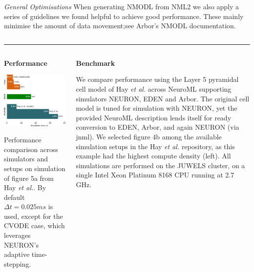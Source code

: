 \documentclass{beamer}
\begin{document}
\begin{frame}[t, fragile]
\begin{columns}[t]
\begin{column}{0.49\textwidth}
      \emph{General Optimisations} When generating NMODL from NML2 we also apply
      a series of guidelines we found helpful to achieve good performance. These
      mainly minimise the amount of data movement;\@ see Arbor's NMODL
      documentation.
    \end{column}
  \end{columns}
  \vspace*{1ex}
  \textcolor{arborange}{\rule{\textwidth}{0.5ex}}
  \vspace*{-1ex}
  \begin{columns}
    \begin{column}{0.74\textwidth}
  \begin{columns}[t]
    \begin{column}[t]{0.45\textwidth}
      \textbf{Performance}
      \vspace*{1ex}

      \includegraphics[width=\textwidth]{./benchmark/barchart_cropped.pdf}

      Performance comparison across simulators and setups on simulation of
      figure 5a from Hay \emph{et al.}. By default $\Delta t = 0.025ms$ is used,
      except for the CVODE case, which leverages NEURON's adaptive time-stepping.
    \end{column}
    \begin{column}[t]{0.54\textwidth}
      \textbf{Benchmark}

      We compare performance using the Layer 5 pyramidal cell model of Hay
      \emph{et al.} across NeuroML supporting simulators NEURON, EDEN and Arbor.
      The original cell model is tuned for simulation with NEURON, yet the
      provided NeuroML description lends itself for ready conversion to EDEN,
      Arbor, and again NEURON (via jnml). We selected figure 4b among the
      available simulation setups in the Hay \emph{et al.} repository, as this
      example had the highest compute density (left). All simulations are
      performed on the JUWELS cluster, on a single Intel Xeon Platinum 8168 CPU
      running at 2.7 GHz.


\end{column}
\end{columns}
\end{column}
\end{columns}
\end{frame}
\end{document}
